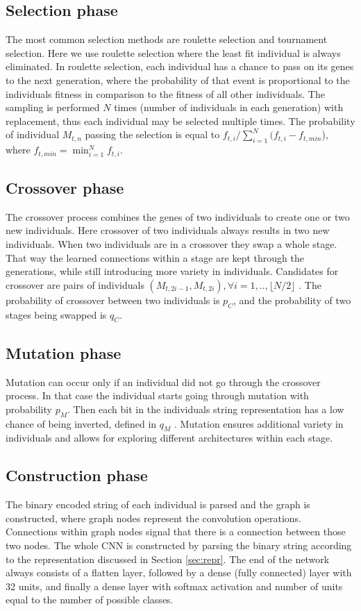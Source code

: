 \documentclass[eng]{simposium}
\begin{document}
\subsection{Selection phase} 
The most common selection methods are roulette selection and tournament selection.  
Here we use roulette selection where the least fit individual is always eliminated. 
In roulette selection, each individual has a chance to pass on its genes to the next generation,  
where the probability of that event is proportional to the individuals fitness in comparison to the fitness of all other individuals. 
The sampling is performed $N$ times (number of individuals in each generation) with replacement, thus each individual may be selected multiple times. 
The probability of individual $M_{t,n}$ passing the selection is equal to $f_{t,i} / \sum_{i=1}^{N} (f_{t,i} - f_{t,min}$), where $f_{t, min} = \min_{i=1}^{N} {f_{t,i}}$. 

\subsection{Crossover phase} 

The crossover process combines the genes of two individuals to create one or two new individuals. 
Here crossover of two individuals always results in two new individuals. 
When two individuals are in a crossover they swap a whole stage. 
That way the learned connections within a stage are kept through the generations, while still introducing more variety in individuals. 
Candidates for crossover are pairs of individuals $(M_{t,2i-1}, M_{t,2i}), \forall i=1,..,\lfloor N/2\rfloor $ \cite{4}. 
The probability of crossover between two individuals is $p_C$, and the probability of two stages being swapped is $q_C$. 

\subsection{Mutation phase} 
Mutation can occur only if an individual did not go through the crossover process. 
In that case the individual starts going through mutation with probability $p_M$. 
Then each bit in the individuals string representation has a low chance of being inverted, defined in $q_M$ \cite{4}. 
Mutation ensures additional variety in individuals and allows for exploring different architectures within each stage. 

\subsection{Construction phase} 
The binary encoded  string of each individual is parsed and the graph is constructed, where graph nodes represent the convolution operations. 
Connections within graph nodes signal that there is a connection between those two nodes. 
The whole CNN is constructed by parsing the binary string according to the representation discussed in Section \ref{sec:repr}.  
The end of the network always consists of a flatten layer, followed by a dense (fully connected) layer with 32 units, and finally a dense  
layer with softmax activation and number of units equal to the number of possible classes. 
\end{document}
